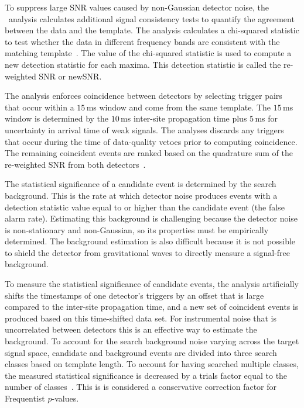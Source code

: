 To suppress large SNR values caused by non-Gaussian detector noise, the \pycbc{}\
 analysis calculates additional signal consistency tests to quantify the agreement between the data
and the template.  The \pycbc{} analysis calculates a chi-squared statistic to
test whether the data in different frequency bands are consistent with
the matching template~\cite{Allen:2004gu}.  The value of the chi-squared
statistic is used to compute a new detection statistic for each maxima.
This detection statistic is called the re-weighted SNR or newSNR.

The \pycbc{} analysis enforces coincidence between detectors by selecting trigger pairs
that occur within a $15\,$ms window and come from the same template.  The
$15\,$ms window is determined by the $10\,$ms inter-site propagation time plus
$5\,$ms for uncertainty in arrival time of weak signals.  The \pycbc{}
analyses discards any triggers that occur during the time of data-quality
vetoes prior to computing coincidence. The remaining coincident events are
ranked based on the quadrature sum of the re-weighted SNR from both
detectors~\cite{Usman:2015kfa}.

The statistical significance of a candidate event is determined by the search background.
This is the rate at which detector noise produces events with a
detection statistic value equal to or higher than the candidate event (the
false alarm rate).  Estimating this background is challenging because 
the detector noise is non-stationary and non-Gaussian, so its properties must
be empirically determined. The background estimation is also difficult because
it is not possible to shield the detector from
gravitational waves to directly measure a signal-free background.

To measure the statistical significance of candidate events, the \pycbc{} analysis
artificially shifts the time\-stamps of one detector's triggers by an offset
that is large compared to the inter-site propagation time, and a new set of
coincident events is produced based on this time-shifted data set. For
instrumental noise that is uncorrelated between detectors this is an effective
way to estimate the background.  To account for the search background noise
varying across the target signal space, candidate and background events are
divided into three search classes based on template length. To account for
having searched multiple classes, the measured statistical significance is decreased by a
trials factor equal to the number of classes~\cite{Lyons:1900zz}. This is
is considered a conservative correction factor for Frequentist $p$-values.

